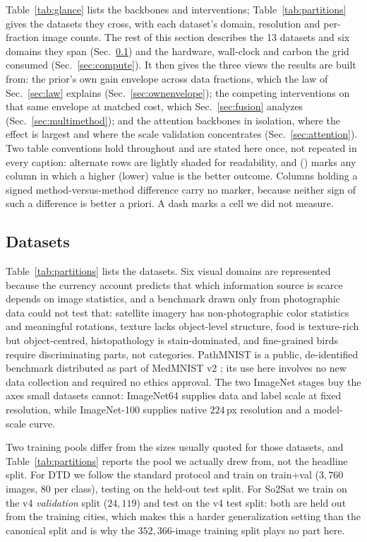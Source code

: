  Table~\ref{tab:glance} lists the backbones and interventions;
Table~\ref{tab:partitions} gives the datasets they cross, with each dataset's
domain, resolution and per-fraction image counts. The rest of this section
describes the 13 datasets and six domains they span
(Sec.~\ref{sec:datasets}) and the hardware, wall-clock and carbon the grid
consumed (Sec.~\ref{sec:compute}). It then gives the three views the results
are built from: the prior's own gain envelope across data fractions, which the
law of Sec.~\ref{sec:law} explains (Sec.~\ref{sec:ownenvelope}); the
competing interventions on that same envelope at matched cost, which
Sec.~\ref{sec:fusion} analyzes (Sec.~\ref{sec:multimethod}); and the
attention backbones in isolation, where the effect is largest and where the
scale validation concentrates (Sec.~\ref{sec:attention}). Two table
conventions hold throughout and are stated here once, not repeated in
every caption: alternate rows are lightly shaded for readability, and \up{}
(\down{}) marks any column in which a higher (lower) value is the better
outcome. Columns holding a signed method-versus-method difference carry no
marker, because neither sign of such a difference is better a priori. A dash
marks a cell we did not measure.

\subsection{Datasets}\label{sec:datasets}


 Table~\ref{tab:partitions} lists the datasets. Six visual domains are
represented because the currency account
predicts that which information source is scarce depends on image statistics,
and a benchmark drawn only from photographic data could not test that:
satellite imagery has non-photographic color statistics and meaningful
rotations, texture lacks object-level structure, food is texture-rich but
object-centred, histopathology is stain-dominated, and fine-grained birds
require discriminating parts, not categories. PathMNIST is a public,
de-identified benchmark distributed as part of MedMNIST v2
\citep{yang2023medmnist}; its use here involves no new data collection and
required no ethics approval. The two ImageNet stages buy the axes small
datasets cannot: ImageNet64 supplies data and label scale at fixed resolution,
while ImageNet-100 supplies native $224$\,px resolution and a model-scale
curve.

Two training pools differ from the sizes usually quoted for those datasets, and
Table~\ref{tab:partitions} reports the pool we actually drew from, not the
headline split. For DTD we follow the standard protocol and train on
train${+}$val ($3{,}760$ images, 80 per class), testing on the held-out test
split. For So2Sat we train on the v4 \emph{validation} split ($24{,}119$) and
test on the v4 test split: both are held out from the training cities, which
makes this a harder generalization setting than the canonical split and is why
the $352{,}366$-image training split plays no part here.

